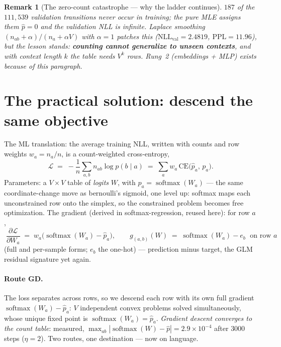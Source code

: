 \documentclass[11pt]{article}
\newtheorem{remark}{Remark}
\newcommand{\smax}{\operatorname{softmax}}
\begin{document}
\begin{remark}[The zero-count catastrophe --- why the ladder continues]
$187$ of the $111{,}539$ validation transitions never occur in
training; the pure MLE assigns them $\hat p = 0$ and the validation NLL
is \emph{infinite}. Laplace smoothing
$(n_{ab}+\alpha)/(n_a+\alpha V)$ with $\alpha = 1$ patches this
($\mathrm{NLL}_{\mathrm{val}} = 2.4819$, $\mathrm{PPL} = 11.96$), but
the lesson stands: \textbf{counting cannot generalize to unseen
contexts}, and with context length $k$ the table needs $V^k$ rows.
Rung~2 (embeddings + MLP) exists because of this paragraph.
\end{remark}

\section{The practical solution: descend the same objective}

The ML translation: the average training NLL, written with counts and
row weights $w_a = n_a/n$, is a count-weighted cross-entropy,
\begin{equation}
  \mathcal{L}
  \;=\; -\frac1n \sum_{a,b} n_{ab} \log p(b \mid a)
  \;=\; \sum_a w_a\, \mathrm{CE}\bigl(\hat{p}_a,\, p_a\bigr).
  \label{eq:celoss}
\end{equation}
Parameters: a $V \times V$ table of \emph{logits} $W$, with
$p_a = \smax(W_a)$ --- the same coordinate-change move as bernoulli's
sigmoid, one level up: softmax maps each unconstrained row onto the
simplex, so the constrained problem becomes free optimization. The
gradient (derived in softmax-regression, reused here): for row $a$,
\begin{equation}
  \boxed{\;\frac{\partial \mathcal{L}}{\partial W_a}
  \;=\; w_a\bigl(\smax(W_a) - \hat{p}_a\bigr),
  \qquad
  g_{(a,b)}(W) \;=\; \smax(W_a) - e_b \;\text{ on row } a\;}
  \label{eq:grad}
\end{equation}
(full and per-sample forms; $e_b$ the one-hot) --- prediction minus
target, the GLM residual signature yet again.

\paragraph{Route GD.} The loss separates across rows, so we descend
each row with its own full gradient $\smax(W_a) - \hat p_a$: $V$
independent convex problems solved simultaneously, whose unique fixed
point is $\smax(W_a) = \hat{p}_a$. \emph{Gradient descent converges to
the count table}: measured, $\max_{ab}|\smax(W)-\hat p| =
2.9\times10^{-4}$ after $3000$ steps ($\eta = 2$). Two routes, one
destination --- now on language.
\end{document}
